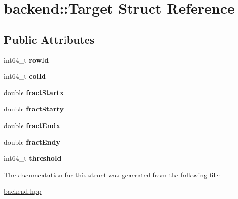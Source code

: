 \hypertarget{structbackend_1_1_target}{}\section{backend\+:\+:Target Struct Reference}
\label{structbackend_1_1_target}
\subsection*{Public Attributes}
\begin{DoxyCompactItemize}
\item 
\mbox{\label{structbackend_1_1_target_a82a3cc2354c8f5cc8f73dd035686a7ae}} 
int64\+\_\+t {\bfseries row\+Id}
\item 
\mbox{\label{structbackend_1_1_target_adb150295c006beca37c931d0a9d075e5}} 
int64\+\_\+t {\bfseries col\+Id}
\item 
\mbox{\label{structbackend_1_1_target_ace53ce7fb79199d53843ba786dd7d8ee}} 
double {\bfseries fract\+Startx}
\item 
\mbox{\label{structbackend_1_1_target_a7c0c2652d93975e915e4b6b038116bce}} 
double {\bfseries fract\+Starty}
\item 
\mbox{\label{structbackend_1_1_target_ace16e945fc4900abf2a809abd24387ae}} 
double {\bfseries fract\+Endx}
\item 
\mbox{\label{structbackend_1_1_target_a8a607576d003f341eec9bcdefc5abde8}} 
double {\bfseries fract\+Endy}
\item 
\mbox{\label{structbackend_1_1_target_a89d5a494c6baf04c5d64443d9c7bf3f6}} 
int64\+\_\+t {\bfseries threshold}
\end{DoxyCompactItemize}


The documentation for this struct was generated from the following file\+:\begin{DoxyCompactItemize}
\item 
\hyperlink{backend_8hpp}{backend.\+hpp}\end{DoxyCompactItemize}
